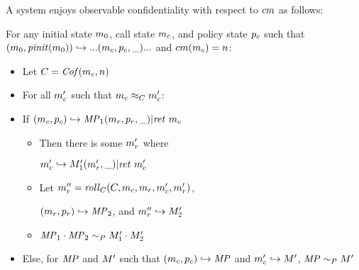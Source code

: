 \documentclass[conference]{IEEEtran}
\begin{document}
      A system enjoys observable confidentiality with respect to \(cm\) as follows:

      For any initial state \(m_0\), call state \(m_c\), and policy state \(p_c\) such that
      \((m_0,\mathit{pinit}(m_0)) \hookrightarrow ... (m_c,p_c,\_) ...\) and
      \(cm(m_c) = n\):

      \begin{itemize}
        \item Let \(C = \mathit{Cof}(m_c,n)\)
        \item For all \(m_c'\) such that \(m_c \approx_C m_c'\):
        \item If \((m_c,p_c) \hookrightarrow \mathit{MP}_1 (m_r,p_r,\_) | \mathit{ret}\ m_c\)
          \begin{itemize}
            \item Then there is some \(m_r'\) where

              \(m_c' \hookrightarrow M_1' (m_r',\_) | \mathit{ret}\ m_c'\)
            \item Let \(m_r'' = \mathit{roll}_C(C,m_c,m_r,m_c',m_r')\),

              \((m_r,p_r) \hookrightarrow \mathit{MP}_2\), and \(m_r'' \hookrightarrow M_2'\)
            \item \(\mathit{MP}_1 \cdot \mathit{MP}_2 \sim_P M_1' \cdot M_2'\)
          \end{itemize}
        \item Else, for \(\mathit{MP}\) and \(M'\) such that \((m_c,p_c) \hookrightarrow \mathit{MP}\)
          and \(m_c' \hookrightarrow M'\), \(\mathit{MP} \sim_P M'\)
      \end{itemize}

\end{document}
